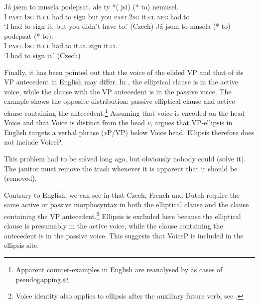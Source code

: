 \documentclass[output=paper,colorlinks,citecolor=brown,
modfonts
]{langscibook}
\begin{document}
\begin{exe}
\ex \label{28}
\begin{xlist}
\ex \label{28a} \gll Já jsem to musela podepsat, ale ty *(\hspace{-2pt} jsi) (*\hspace{-2pt} to) nemusel.\\
I \textsc{past}.\textsc{1sg} it.\textsc{cl} had.to sign but you {} \textsc{past}.\textsc{2sg} {} it.\textsc{cl} \textsc{neg}.had.to\\
\glt `I had to sign it, but you didn't have to.' \hfill (Czech)
\ex \label{28b} \gll Já jsem to musela  (*\hspace{-2pt} to)   podepsat (*\hspace{-2pt} to).\\
I \textsc{past}.\textsc{1sg} it.\textsc{cl} had.to  {} it.\textsc{cl}  sign  {} it.\textsc{cl} \\
\glt `I had to sign it.' \hfill (Czech)
\end{xlist}	
\end{exe}


\noindent Finally, it has been pointed out \citep{Hardt1993,Merchant2008a,Merchant2013} that the voice of the elided VP and that of its VP antecedent in English may differ. In , the elliptical clause is in the active voice, while the clause with the VP antecedent is in the passive voice. The example  shows the opposite distribution: passive elliptical clause and active clause containing the antecedent.\footnote{Apparent counter-examples in English are reanalysed by \cite{Merchant2013} as cases of pseudogapping.} Assuming that voice is encoded on the head Voice and that Voice is distinct from the head \textit{v}, \cite{Merchant2008a} argues that VP-ellipsis in English targets a verbal phrase (\textit{v}P/VP) below Voice head. Ellipsis therefore does not include VoiceP. 

\begin{exe}
\ex \label{29}
\begin{xlist}
\ex \label{29a}This problem had to be solved long ago, but obviously nobody could (solve it). \hfill \citep{Merchant2008a}
\ex \label{29b}The janitor must remove the trash whenever it is apparent that it should be (removed). \hfill \citep{Merchant2008a}
\end{xlist}
\end{exe}


\noindent Contrary to English, we can see in  that Czech, French and Dutch require the same active or passive morphosyntax in both the elliptical clause and the clause containing the VP antecedent.\footnote{Voice identity also applies to ellipsis after the auxiliary future verb, see .} Ellipsis is excluded here because the elliptical clause is presumably in the active voice, while the clause containing the antecedent is in the passive voice. This suggests that VoiceP is included in the ellipsis site.
\end{document}

